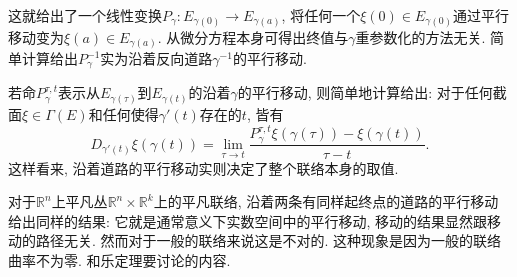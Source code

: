 这就给出了一个线性变换$P_{\gamma}:E_{\gamma(0)}\to E_{\gamma(a)}$, 将任何一个$\xi(0)\in E_{\gamma(0)}$通过平行移动变为$\xi(a)\in E_{\gamma(a)}$. 从微分方程本身可得出终值与$\gamma$重参数化的方法无关. 简单计算给出$P_\gamma^{-1}$实为沿着反向道路$\gamma^{-1}$的平行移动. 

若命$P_\gamma^{\tau,t}$表示从$E_{\gamma(\tau)}$到$E_{\gamma(t)}$的沿着$\gamma$的平行移动, 则简单地计算给出: 对于任何截面$\xi\in\Gamma(E)$和任何使得$\gamma'(t)$存在的$t$, 皆有
$$
D_{\gamma'(t)}\xi(\gamma(t))=\lim_{\tau\to t}\frac{P_\gamma^{\tau,t}\xi(\gamma(\tau))-\xi(\gamma(t))}{\tau-t}.
$$
这样看来, 沿着道路的平行移动实则决定了整个联络本身的取值.

对于$\mathbb{R}^n$上平凡丛$\mathbb{R}^n\times\mathbb{R}^k$上的平凡联络, 沿着两条有同样起终点的道路的平行移动给出同样的结果: 它就是通常意义下实数空间中的平行移动, 移动的结果显然跟移动的路径无关. 然而对于一般的联络来说这是不对的. 这种现象是因为一般的联络曲率不为零. 和乐定理要讨论的内容.